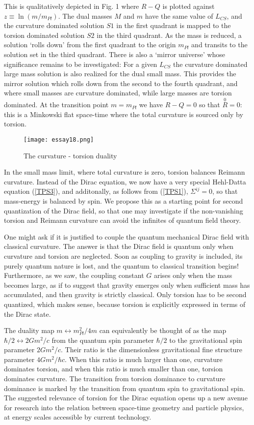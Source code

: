 \documentclass[prd, preprint, 12pt]{revtex4-1}
\begin{document}
This is qualitatively depicted in Fig. 1 where $R-Q$ is plotted against $z\equiv \ln(m/m_{Pl})$. The dual masses $M$ and $m$ have the same value of $L_{CS}$, and the curvature dominated solution $S1$ in the first quadrant is mapped to the torsion dominated solution $S2$ in the third quadrant. As the mass is reduced, a solution `rolls down' from the first quadrant to the origin $m_{Pl}$ and transits to the solution set in the third quadrant. There is also a `mirror universe' whose significance remains to be investigated: For a given $L_{CS}$ the curvature dominated large mass solution is also realized for the dual small mass. This provides the mirror solution which rolls down from the second to the fourth quadrant, and where small masses are curvature dominated, while large masses are torsion dominated. At the transition point $m=m_{Pl}$ we have $R-Q=0$ so that $\overset{0}{R}=0$: this is a Minkowski flat space-time where the total curvature is sourced only by torsion.
\begin{figure} [ht]
 { \centerline{\texttt{[image: essay18.png]}}}
\caption{The curvature - torsion duality }
\end{figure}%

In the small mass limit, where total curvature is zero, torsion balances Reimann curvature. Instead of the Dirac equation, we now have a very special Hehl-Datta equation (\ref{TPS3}), and additonally, as follows from (\ref{TPS1}), $\Sigma^{ij}=0$, so that mass-energy is balanced by spin. We propose this as a starting point for second quantization of the Dirac field, so that one may
investigate if the non-vanishing torsion and Reimann curvature can avoid the infinites of quantum field theory. 

One might ask if it is justified to couple the quantum mechanical Dirac field with classical curvature. The answer is that the Dirac field is quantum only when curvature and torsion are neglected. Soon as coupling to gravity is included, its purely quantum nature is lost, and the quantum to classical transition begins! Furthermore, as we saw, the coupling constant $G$ arises only when the mass becomes large, as if to suggest that gravity emerges only when sufficient mass has accumulated, and then gravity is strictly classical. Only torsion has to be second quantized, which makes sense, because torsion is explicitly expressed in terms of the Dirac state.

The duality map $m\leftrightarrow m_{Pl}^2 / 4m$ can equivalently be thought of as the map $\hbar/2 \leftrightarrow 2Gm^2/c$ from the quantum spin parameter
$\hbar/2$ to the gravitational spin parameter $2Gm^2/c$. Their ratio is the dimensionless gravitational fine structure parameter $4Gm^2/\hbar c$. When this ratio is much larger than one, curvature dominates torsion, and when this ratio is much smaller than one, torsion dominates curvature. The transition from torsion dominance to curvature dominance is marked by the transition from quantum spin to gravitational spin. The suggested relevance of torsion for the Dirac equation opens up a new avenue for research into the relation between space-time geometry and particle physics, at energy scales accessible by current technology.
\end{document}
